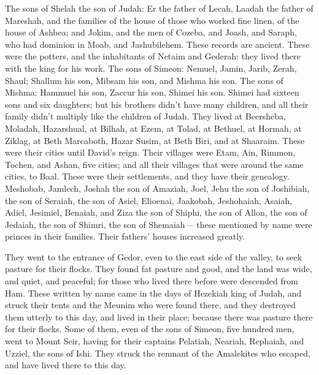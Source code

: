 {The sons of Shelah the son of Judah: Er the father of Lecah, Laadah the father of Mareshah, and the families of the house of those who worked fine linen, of the house of Ashbea;
and Jokim, and the men of Cozeba, and Joash, and Saraph, who had dominion in Moab, and Jashubilehem. These records are ancient.
These were the potters, and the inhabitants of Netaim and Gederah: they lived there with the king for his work.
The sons of Simeon: Nemuel, Jamin, Jarib, Zerah, Shaul;
Shallum his son, Mibsam his son, and Mishma his son.
The sons of Mishma: Hammuel his son, Zaccur his son, Shimei his son.
Shimei had sixteen sons and six daughters; but his brothers didn’t have many children, and all their family didn’t multiply like the children of Judah.
They lived at Beersheba, Moladah, Hazarshual,
at Bilhah, at Ezem, at Tolad,
at Bethuel, at Hormah, at Ziklag,
at Beth Marcaboth, Hazar Susim, at Beth Biri, and at Shaaraim. These were their cities until David’s reign.
Their villages were Etam, Ain, Rimmon, Tochen, and Ashan, five cities;
and all their villages that were around the same cities, to Baal. These were their settlements, and they have their genealogy.
Meshobab, Jamlech, Joshah the son of Amaziah,
Joel, Jehu the son of Joshibiah, the son of Seraiah, the son of Asiel,
Elioenai, Jaakobah, Jeshohaiah, Asaiah, Adiel, Jesimiel, Benaiah,
and Ziza the son of Shiphi, the son of Allon, the son of Jedaiah, the son of Shimri, the son of Shemaiah—
these mentioned by name were princes in their families. Their fathers’ houses increased greatly.
\par }{\PP {}They went to the entrance of Gedor, even to the east side of the valley, to seek pasture for their flocks.
They found fat pasture and good, and the land was wide, and quiet, and peaceful; for those who lived there before were descended from Ham.
These written by name came in the days of Hezekiah king of Judah, and struck their tents and the Meunim who were found there, and they destroyed them utterly to this day, and lived in their place; because there was pasture there for their flocks.
Some of them, even of the sons of Simeon, five hundred men, went to Mount Seir, having for their captains Pelatiah, Neariah, Rephaiah, and Uzziel, the sons of Ishi.
They struck the remnant of the Amalekites who escaped, and have lived there to this day.

}
